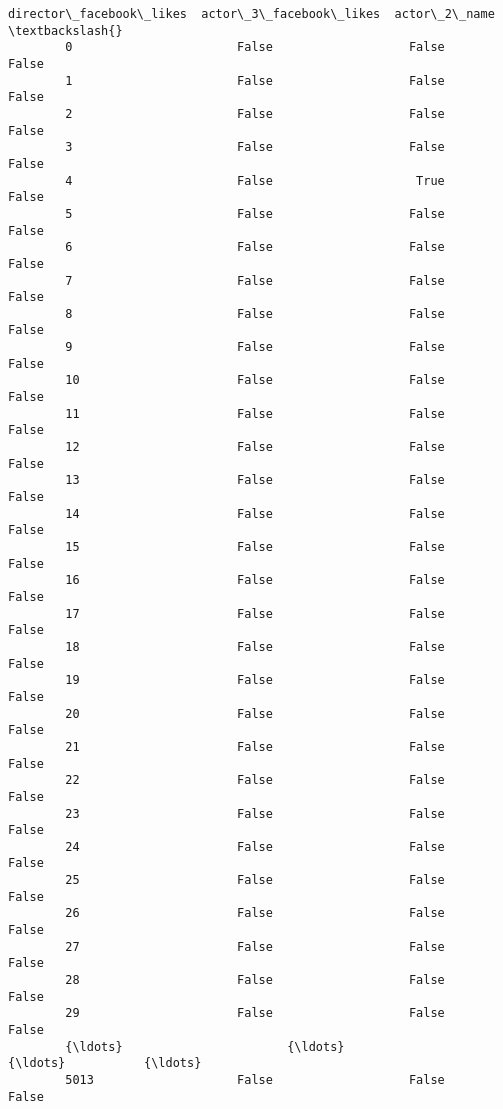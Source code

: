 \documentclass[11pt]{article}
\begin{document}
\begin{Verbatim}[commandchars=\\\{\}]
              director\_facebook\_likes  actor\_3\_facebook\_likes  actor\_2\_name  \textbackslash{}
        0                       False                   False         False   
        1                       False                   False         False   
        2                       False                   False         False   
        3                       False                   False         False   
        4                       False                    True         False   
        5                       False                   False         False   
        6                       False                   False         False   
        7                       False                   False         False   
        8                       False                   False         False   
        9                       False                   False         False   
        10                      False                   False         False   
        11                      False                   False         False   
        12                      False                   False         False   
        13                      False                   False         False   
        14                      False                   False         False   
        15                      False                   False         False   
        16                      False                   False         False   
        17                      False                   False         False   
        18                      False                   False         False   
        19                      False                   False         False   
        20                      False                   False         False   
        21                      False                   False         False   
        22                      False                   False         False   
        23                      False                   False         False   
        24                      False                   False         False   
        25                      False                   False         False   
        26                      False                   False         False   
        27                      False                   False         False   
        28                      False                   False         False   
        29                      False                   False         False   
        {\ldots}                       {\ldots}                     {\ldots}           {\ldots}   
        5013                    False                   False         False   

\end{Verbatim}
\end{document}
